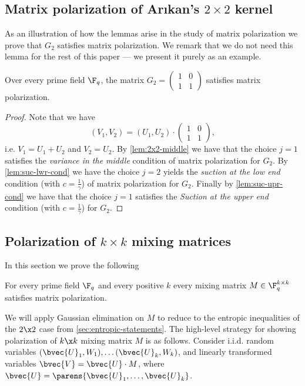 \documentclass[11pt]{article}
\newcommand{\Arikan}{Ar\i kan}
\begin{document}
\subsection{Matrix polarization of \Arikan's $2 \times 2$ kernel}
As an illustration of how the lemmas arise in the study of matrix polarization we prove that $G_2$ satisfies matrix polarization. We remark that we do not need this lemma for the rest of this paper --- we present it purely as an example.

\begin{lemma}\label{lem:g2-polarizes}
	Over every prime field $\F_q$, the matrix $G_2 = \left(\begin{smallmatrix} 1 & 0 \\ 1 & 1 \end{smallmatrix}\right)$ satisfies matrix polarization.
\end{lemma}
\begin{proof}
	Note that we have
	\[(V_1,V_2)=(U_1,U_2)\cdot \left(\begin{matrix} 1 & 0 \\ 1 & 1 \end{matrix}\right),\]
	i.e. $V_1=U_1+U_2$ and $V_2=U_2$.
	By \cref{lem:2x2-middle} we have that the choice $j=1$ satisfies the \emph{variance in the middle} condition of matrix polarization for $G_2$. By \cref{lem:suc-lwr-cond} we have the choice $j=2$ yields the \emph{suction at the low end} condition (with $c=\frac 1\gamma$) of matrix polarization for $G_2$. Finally by \cref{lem:suc-upr-cond} we have that the choice $j=1$ satisfies the \emph{Suction at the upper end} condition (with $c=\frac 1\gamma$) for $G_2$.
\end{proof}

\subsection{Polarization of $k \times k$ mixing matrices \label{sec:local-k-by-k}}

In this section we prove the following
\begin{lemma}
	\label{lem:k-by-k-polarize}
	For every prime field $\F_q$ and every positive $k$ every mixing matrix $M \in \F_q^{k \times k}$ satisfies matrix polarization.
	
\end{lemma}

We will apply Gaussian elimination on $M$ to reduce to the entropic inequalities of the $2 \x 2$ case
from \cref{sec:entropic-statements}.
The high-level strategy for showing polarization of $k \x k$ mixing matrix $M$ is as follows. Consider i.i.d. random variables $(\bvec{U}_1, {W}_1), \ldots (\bvec{U}_k, {W}_k)$, and linearly transformed variables $\bvec{V} = \bvec{U} \cdot M$, where $\bvec{U}=\parens{\bvec{U}_1,\dots,\bvec{U}_k}$.
\end{document}
